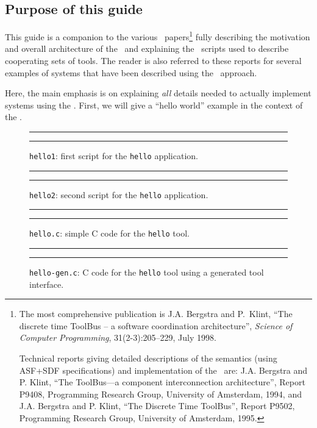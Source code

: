 \documentclass[a4,twoside,noweb]{article} %
\begin{document}
\subsection{Purpose of this guide}
This guide is a companion to the various \TB\ papers\footnote{The most comprehensive
publication is J.A. Bergstra and P.~Klint,
``The discrete time {T}ool{B}us -- a software coordination
  architecture'', {\em Science of Computer Programming}, 31(2-3):205--229, July 1998.  

Technical reports giving detailed descriptions of the semantics (using ASF+SDF specifications)
and implementation of the \TB\ are:
J.A. Bergstra and
P. Klint, ``The ToolBus---a component interconnection architecture'',
Report P9408, Programming Research Group, University of Amsterdam,
1994, and J.A. Bergstra and P. Klint, ``The Discrete Time ToolBus'',
Report P9502, Programming Research Group, University of Amsterdam, 1995.}
fully describing the motivation and overall architecture of the
\TB\ and explaining the \T\ scripts used to describe cooperating sets
of tools. The reader is also referred to these reports for several examples
of systems that have been described using the \TB\ approach.

Here, the main  emphasis is on explaining {\em all} details needed to actually
implement systems using the \TB. First, we will give a ``hello world'' example
in the context of the \TB.
\begin{figure}[tbh]
\rule{\textwidth}{0.5mm}

  \caption{{\tt hello1}: first script for the {\tt hello} application.}
  \label{fig:hello1.tb}
\rule{\textwidth}{0.5mm}
\end{figure}

\begin{figure}[tbh]
\rule{\textwidth}{0.5mm}

  \caption{{\tt hello2}: second script for the {\tt hello} application.}
  \label{fig:hello2.tb}
\rule{\textwidth}{0.5mm}
\end{figure}

\begin{figure}[h]
\rule{\textwidth}{0.5mm}

  \caption{{\tt hello.c}: simple C code for the {\tt hello} tool.}
  \label{fig:hello.c}
\rule{\textwidth}{0.5mm}
\end{figure}

\begin{figure}[h]
\rule{\textwidth}{0.5mm}

  \caption{{\tt hello-gen.c}: C code for the {\tt hello} tool using a generated tool interface.}
  \label{fig:hello-gen.c}
\rule{\textwidth}{0.5mm}
\end{figure}
\end{document}
